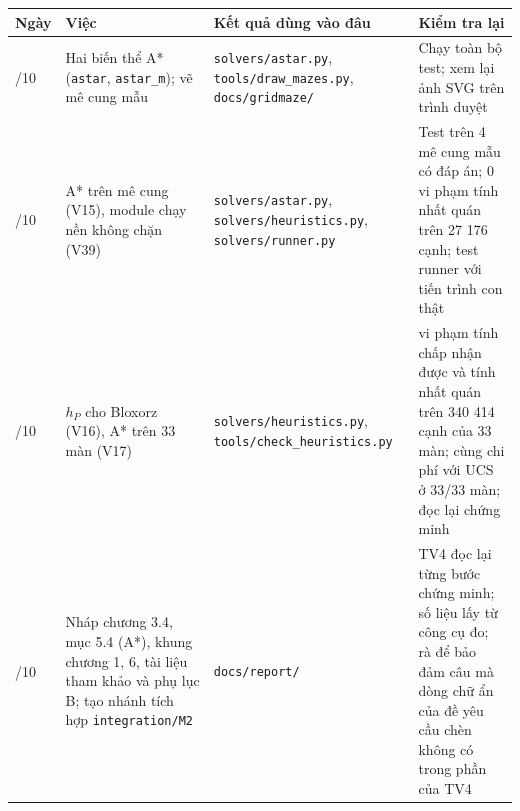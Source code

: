 {\def\LTcaptype{none} %
\begin{longtable}[]{@{}
  >{\raggedright\arraybackslash}p{}
  >{\raggedright\arraybackslash}p{}
  >{\raggedright\arraybackslash}p{}
  >{\raggedright\arraybackslash}p{}@{}}
\toprule\noalign{}
\rowcolor{tablehead}\begin{minipage}[b]{\linewidth}\raggedright
\textbf{Ngày}
\end{minipage} & \begin{minipage}[b]{\linewidth}\raggedright
\textbf{Việc}
\end{minipage} & \begin{minipage}[b]{\linewidth}\raggedright
\textbf{Kết quả dùng vào đâu}
\end{minipage} & \begin{minipage}[b]{\linewidth}\raggedright
\textbf{Kiểm tra lại}
\end{minipage} \\
\midrule\noalign{}
\endhead
\bottomrule\noalign{}
\endlastfoot
20/10 & Hai biến thể A* (\texttt{astar}, \texttt{astar\_\allowbreak{}m}); vẽ mê cung mẫu & \texttt{solvers/\allowbreak{}astar.\allowbreak{}py}, \texttt{tools/\allowbreak{}draw\_\allowbreak{}mazes.\allowbreak{}py}, \texttt{docs/\allowbreak{}gridmaze/\allowbreak{}} & Chạy toàn bộ test; xem lại ảnh SVG trên trình duyệt \\
\rowrule
20/10 & A* trên mê cung (V15), module chạy nền không chặn (V39) & \texttt{solvers/\allowbreak{}astar.\allowbreak{}py}, \texttt{solvers/\allowbreak{}heuristics.\allowbreak{}py}, \texttt{solvers/\allowbreak{}runner.\allowbreak{}py} & Test trên 4 mê cung mẫu có đáp án; 0 vi phạm tính nhất quán trên 27 176 cạnh; test runner với tiến trình con thật \\
\rowrule
23/10 & \(h_P\) cho Bloxorz (V16), A* trên 33 màn (V17) & \texttt{solvers/\allowbreak{}heuristics.\allowbreak{}py}, \texttt{tools/\allowbreak{}check\_\allowbreak{}heuristics.\allowbreak{}py} & 0 vi phạm tính chấp nhận được và tính nhất quán trên 340 414 cạnh của 33 màn; cùng chi phí với UCS ở 33/33 màn; đọc lại chứng minh \\
\rowrule
26/10 & Nháp chương 3.4, mục 5.4 (A*), khung chương 1, 6, tài liệu tham khảo và phụ lục B; tạo nhánh tích hợp \texttt{integration/\allowbreak{}M2} & \texttt{docs/\allowbreak{}report/\allowbreak{}} & TV4 đọc lại từng bước chứng minh; số liệu lấy từ công cụ đo; rà để bảo đảm câu mà dòng chữ ẩn của đề yêu cầu chèn không có trong phần của TV4 \\
\end{longtable}
}

